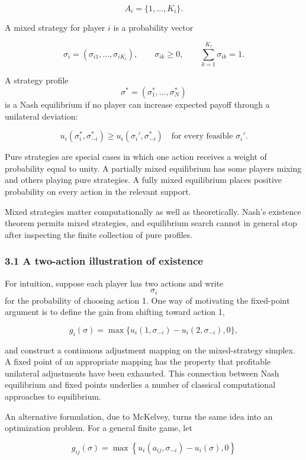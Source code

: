 \documentclass[11pt]{article}
\begin{document}
\[
A_i=\{1,\ldots,K_i\}.
\]

A mixed strategy for player \(i\) is a probability vector

\[
\sigma_i=(\sigma_{i1},\ldots,\sigma_{iK_i}),
\qquad
\sigma_{ik}\geq 0,
\qquad
\sum_{k=1}^{K_i}\sigma_{ik}=1.
\]

A strategy profile \[\sigma^*=(\sigma_1^*,\ldots,\sigma_N^*)\] is a Nash
equilibrium if no player can increase expected payoff through a
unilateral deviation:

\[
u_i(\sigma_i^*,\sigma_{-i}^*)
\geq
u_i(\sigma_i',\sigma_{-i}^*)
\quad
\text{for every feasible }\sigma_i'.
\]

Pure strategies are special cases in which one action receives a weight
of probability equal to unity. A partially mixed equilibrium has some
players mixing and others playing pure strategies. A fully mixed
equilibrium places positive probability on every action in the relevant
support.

Mixed strategies matter computationally as well as theoretically. Nash's
existence theorem permits mixed strategies, and equilibrium search
cannot in general stop after inspecting the finite collection of pure
profiles.

    \hypertarget{a-two-action-illustration-of-existence}{%
\subsubsection{3.1 A two-action illustration of
existence}\label{a-two-action-illustration-of-existence}}

For intuition, suppose each player has two actions and write
\[\sigma_i\] for the probability of choosing action 1. One way of
motivating the fixed-point argument is to define the gain from shifting
toward action 1,

\[
g_i(\sigma)
=
\max\{u_i(1,\sigma_{-i})-u_i(2,\sigma_{-i}),0\},
\]

and construct a continuous adjustment mapping on the mixed-strategy
simplex. A fixed point of an appropriate mapping has the property that
profitable unilateral adjustments have been exhausted. This connection
between Nash equilibrium and fixed points underlies a number of
classical computational approaches to equilibrium.

An alternative formulation, due to McKelvey, turns the same idea into an
optimization problem. For a general finite game, let

\[
g_{ij}(\sigma)
=
\max\left\{
u_i(a_{ij},\sigma_{-i})-u_i(\sigma),0
\right\}
\]
\end{document}
